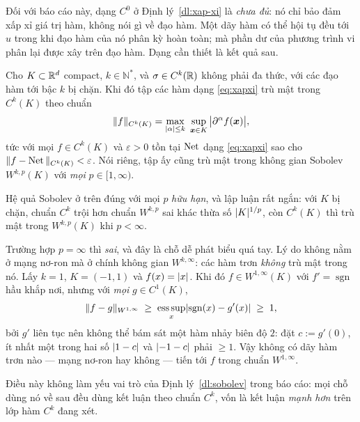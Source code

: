 Đối với báo cáo này, dạng $C^0$ ở Định lý~\ref{dl:xap-xi} là \emph{chưa đủ}: nó
chỉ bảo đảm xấp xỉ giá trị hàm, không nói gì về đạo hàm. Một dãy hàm có thể hội
tụ đều tới $u$ trong khi đạo hàm của nó phân kỳ hoàn toàn; mà phần dư của phương
trình vi phân lại được xây trên đạo hàm. Dạng cần thiết là kết quả sau.
 
\begin{dinhly}
\label{dl:sobolev}
Cho $K \subset \mathbb{R}^d$ compact, $k \in \mathbb{N}^{*}$, và $\sigma \in C^{k}(\mathbb{R})$
không phải đa thức, với các đạo hàm tới bậc $k$ bị chặn. Khi đó tập các hàm dạng
\eqref{eq:xapxi} trù mật trong $C^{k}(K)$ theo chuẩn
\begin{equation}
\|f\|_{C^k(K)} = \max_{|\alpha| \le k}\ \sup_{\bm{x} \in K}
  \big| \partial^{\alpha} f(\bm{x}) \big| ,
\label{eq:chuan-ck}
\end{equation}
tức với mọi $f \in C^k(K)$ và $\varepsilon > 0$ tồn tại $\operatorname{Net}$ dạng
\eqref{eq:xapxi} sao cho $\|f - \operatorname{Net}\|_{C^k(K)} < \varepsilon$. Nói riêng, tập
ấy cũng trù mật trong không gian Sobolev $W^{k,p}(K)$ với \emph{mọi}
$p \in [1,\infty)$.
\end{dinhly}

\begin{nhanxet}[Vì sao phải loại trừ $p = \infty$]
\label{nx:khong-p-vo-cung}
Hệ quả Sobolev ở trên đúng với mọi $p$ \emph{hữu hạn}, và lập luận rất ngắn: với
$K$ bị chặn, chuẩn $C^k$ trội hơn chuẩn $W^{k,p}$ sai khác thừa số
$\lvert K\rvert^{1/p}$, còn $C^k(K)$ thì trù mật trong $W^{k,p}(K)$ khi $p < \infty$.

Trường hợp $p = \infty$ thì \emph{sai}, và đây là chỗ dễ phát biểu quá tay. Lý
do không nằm ở mạng nơ-ron mà ở chính không gian $W^{k,\infty}$: các hàm trơn
\emph{không} trù mật trong nó. Lấy $k=1$, $K=(-1,1)$ và $f(x) = \lvert x\rvert$. Khi
đó $f \in W^{1,\infty}(K)$ với $f' = \operatorname{sgn}$ hầu khắp nơi, nhưng với
\emph{mọi} $g \in C^1(K)$,
\[
\lVert f-g\rVert_{W^{1,\infty}}
 \;\ge\; \operatorname*{ess\,sup}_{x}\lvert\operatorname{sgn}(x) - g'(x)\rvert
 \;\ge\; 1,
\]
bởi $g'$ liên tục nên không thể bám sát một hàm nhảy biên độ $2$: đặt
$c := g'(0)$, ít nhất một trong hai số $\lvert1-c\rvert$ và $\lvert-1-c\rvert$ phải
$\ge 1$. Vậy không có dãy hàm trơn nào --- mạng nơ-ron hay không --- tiến tới
$f$ trong chuẩn $W^{1,\infty}$.

Điều này không làm yếu vai trò của Định lý~\ref{dl:sobolev} trong báo cáo: mọi
chỗ dùng nó về sau đều dùng kết luận theo chuẩn $C^k$, vốn là kết luận
\emph{mạnh hơn} trên lớp hàm $C^k$ đang xét.
\end{nhanxet}
 
